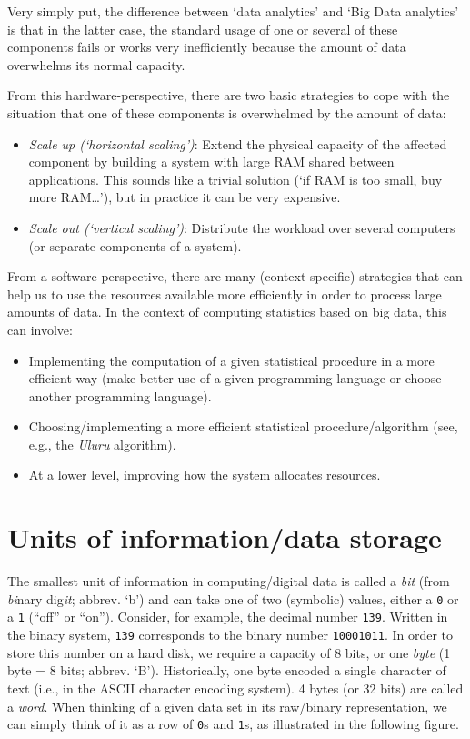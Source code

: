 \documentclass[
  12pt,
]{style/krantz}
\providecommand{\tightlist}{%
  \setlength{\itemsep}{0pt}\setlength{\parskip}{0pt}}
\begin{document}
Very simply put, the difference between `data analytics' and `Big Data analytics' is that in the latter case, the standard usage of one or several of these components fails or works very inefficiently because the amount of data overwhelms its normal capacity.

From this hardware-perspective, there are two basic strategies to cope with the situation that one of these components is overwhelmed by the amount of data:

\begin{itemize}
\tightlist
\item
  \emph{Scale up (`horizontal scaling')}: Extend the physical capacity of the affected component by building a system with large RAM shared between applications. This sounds like a trivial solution (`if RAM is too small, buy more RAM\ldots{}'), but in practice it can be very expensive.
\item
  \emph{Scale out (`vertical scaling')}: Distribute the workload over several computers (or separate components of a system).
\end{itemize}

From a software-perspective, there are many (context-specific) strategies that can help us to use the resources available more efficiently in order to process large amounts of data. In the context of computing statistics based on big data, this can involve:

\begin{itemize}
\tightlist
\item
  Implementing the computation of a given statistical procedure in a more efficient way (make better use of a given programming language or choose another programming language).
\item
  Choosing/implementing a more efficient statistical procedure/algorithm (see, e.g., the \emph{Uluru} algorithm).
\item
  At a lower level, improving how the system allocates resources.
\end{itemize}

\hypertarget{units-of-informationdata-storage}{%
\section{Units of information/data storage}\label{units-of-informationdata-storage}}

The smallest unit of information in computing/digital data is called a \emph{bit} (from \emph{bi}nary dig\emph{it}; abbrev. `b') and can take one of two (symbolic) values, either a \texttt{0} or a \texttt{1} (``off'' or ``on''). Consider, for example, the decimal number \texttt{139}. Written in the binary system, \texttt{139} corresponds to the binary number \texttt{10001011}. In order to store this number on a hard disk, we require a capacity of 8 bits, or one \emph{byte} (1 byte = 8 bits; abbrev. `B'). Historically, one byte encoded a single character of text (i.e., in the ASCII character encoding system). 4 bytes (or 32 bits) are called a \emph{word}. When thinking of a given data set in its raw/binary representation, we can simply think of it as a row of \texttt{0}s and \texttt{1}s, as illustrated in the following figure.
\end{document}
